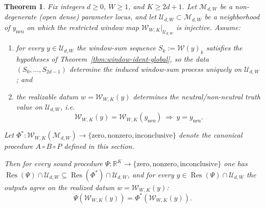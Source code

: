 \documentclass[11pt,reqno]{amsart}
\newtheorem{theorem}{Theorem}[section]
\theoremstyle{definition}
\theoremstyle{remark}
\newcommand{\R}{\mathbb{R}}
\newcommand{\1}{\mathbf{1}}
\newcommand{\zero}{\mathrm{zero}}
\newcommand{\nonzero}{\mathrm{nonzero}}
\newcommand{\inconclusive}{\mathrm{inconclusive}}
\begin{document}
\begin{theorem}\label{thm:domination}
Fix integers $d\ge 0$, $W\ge 1$, and $K\ge 2d+1$.
Let $\mathcal{M}_{d,W}$ be a non-degenerate (open dense) parameter locus, and let
$\mathcal{U}_{d,W}\subset\mathcal{M}_{d,W}$ be a neighborhood of $y_{\mathrm{neu}}$ on which the restricted window map
$\mathcal{W}_{W,K}\vert_{\mathcal{U}_{d,W}}$ is injective.
Assume:


\begin{enumerate}[label=\textup{(\alph*)},leftmargin=2.2em]
\item for every $y\in\mathcal{U}_{d,W}$ the window-sum sequence $S_k:=\mathcal{W}(y)_k$ satisfies the hypotheses of Theorem~\ref{thm:window-ident-global}, so the data $(S_0,\dots,S_{2d-1})$ determine the induced window-sum process uniquely on $\mathcal{U}_{d,W}$; and
\item the realizable datum $w=\mathcal{W}_{W,K}(y)$ determines the neutral/non-neutral truth value on $\mathcal{U}_{d,W}$, i.e.\ \[
\mathcal{W}_{W,K}(y)=\mathcal{W}_{W,K}(y_{\mathrm{neu}})\ \Longrightarrow\ y=y_{\mathrm{neu}}.
\]
\end{enumerate}

Let $\Phi^\ast:\mathcal{W}_{W,K}(\mathcal{M}_{d,W})\to\{\zero,\nonzero,\inconclusive\}$ denote the canonical procedure $A\circ B\circ P$ defined in this section.

Then for every sound procedure $\Psi:\R^K\to\{\zero,\nonzero,\inconclusive\}$ one has
$\operatorname{Res}(\Psi)\cap\mathcal{U}_{d,W}\subseteq \operatorname{Res}(\Phi^\ast)\cap\mathcal{U}_{d,W}$, and for every
$y\in\operatorname{Res}(\Psi)\cap\mathcal{U}_{d,W}$ the outputs agree on the realized datum $w=\mathcal{W}_{W,K}(y)$:
\[
\Psi(\mathcal{W}_{W,K}(y))=\Phi^\ast(\mathcal{W}_{W,K}(y)).
\]

\end{theorem}
\end{document}
